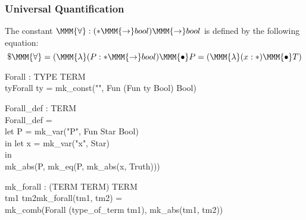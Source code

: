 \documentclass[a4paper,11pt,titlepage]{article}
\begin{document}
\begin{titlepage}
\subsubsection{Universal Quantification}
The constant $\MMM{\forall} : (* \MMM{\rightarrow} bool) \MMM{\rightarrow} bool$ is defined by
the following equation:
$$\$\MMM{\forall} = (\MMM{\lambda}(P : * \MMM{\rightarrow} bool) \MMM{\bullet} P = (\MMM{\lambda}(x:*) \MMM{\bullet} T)$$

\begin{HOLConst}
\+	\PrNL{}Forall\PrNN{} : TYPE \MMM{\rightarrow} TERM\\
\PrPH{}
\+	\MMM{\forall} ty\MMM{\bullet}Forall ty = mk\_const("\MMM{\forall}", Fun (Fun ty Bool) Bool)\\
\end{HOLConst}
\begin{HOLConst}
\+	\PrNL{}Forall\_def\PrNN{} : TERM\\
\PrPH{}
\+	Forall\_def =\\
\+	let P = mk\_var("P", Fun Star Bool)\\
\+	in let x = mk\_var("x", Star)\\
\+	in\\
\+	mk\_abs(P, mk\_eq(P, mk\_abs(x,  Truth)))\\
\end{HOLConst}
\begin{HOLConst}
\+	\PrNL{}mk\_forall\PrNN{} : (TERM \MMM{\times} TERM) \MMM{\rightarrow} TERM\\
\PrPH{}
\+	\MMM{\forall} tm1 tm2\MMM{\bullet}mk\_forall(tm1, tm2) =\\
\+			mk\_comb(Forall (type\_of\_term tm1), mk\_abs(tm1, tm2))\\
\end{HOLConst}

\end{titlepage}
\end{document}
